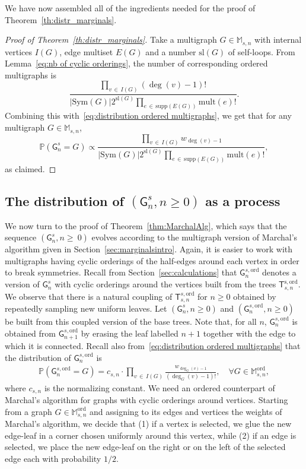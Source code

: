 \documentclass[10pt]{amsart}
\theoremstyle{definition}\newtheorem{defi}[theo]{Definition}\newtheorem{rema}[theo]{Remark}\newtheorem{exam}[theo]{Example}\newtheorem{exem}[theo]{Example}\newtheorem{nota}[theo]{Notation}
\newcommand{\abs}[1]{\left\lvert#1\right\rvert}
\newcommand{\Pp}[1]{\mathbb{P} \left(#1\right)}
\newcommand{\supp}{\mathrm{supp}}
\newcommand{\ord}{\mathrm{ord}}
\newcommand{\sll}{\mathrm{sl}}
\newcommand{\Sym}{\mathrm{Sym}}
\newcommand{\mult}{\mathrm{mult}}
\newcommand{\sG}{\mathsf{G}}
\newcommand{\sT}{\mathsf{T}}
\newcommand{\M}{\mathbb{M}}
\let\oldforall\forall
\renewcommand*{\forall}{\mathrel{\oldforall}}
\begin{document}

We have now assembled all of the ingredients needed for the proof of Theorem~\ref{th:distr_marginals}.

\begin{proof}[Proof of Theorem~\ref{th:distr_marginals}]
Take a multigraph $G\in \M_{s,n}$ with internal vertices $I(G)$, edge multiset $E(G)$ and a number $\sll(G)$ of self-loops. From Lemma~\ref{eq:nb of cyclic orderings}, the number of corresponding ordered multigraphs is
\begin{equation*}
\frac{\prod\limits_{v\,\in\,I(G)}\left(\deg(v)-1\right)!}{\abs{\Sym(G)}2^{\sll(G)}\prod\limits_{e\,\in\,\supp(E(G))}\mult(e)!}.
\end{equation*}
Combining this with~\eqref{eq:distribution ordered multigraphs}, we get that for any multigraph $G\in \M_{s,n}$,
\[
\Pp{\sG^s_{n}=G}\propto\frac{\prod\limits_{v\,\in\,I(G)} w_{\deg(v)-1}}{\abs{\Sym(G)}2^{\sll(G)}\prod\limits_{e\,\in\,\supp(E(G))}\mult(e)!},
\]
as claimed.
\end{proof}

\subsection{The distribution of \texorpdfstring{$(\sG^s_{n}, n \ge 0)$}{(sGsn, n >= 0)} as a process}\label{sec:Marchal}

We now turn to the proof of Theorem~\ref{thm:MarchalAlg}, which says that the sequence $(\sG^s_{n},n\geq~0)$ evolves according to the multigraph version of Marchal's algorithm given in Section~\ref{sec:marginalsintro}. Again, it is easier to work with multigraphs having cyclic orderings of the half-edges around each vertex in order to break symmetries. Recall from Section~\ref{sec:calculations} that $\sG^{s,\ord}_{n}$ denotes a version of $\sG^{s}_n$ with cyclic orderings around the vertices built from the trees $\sT^{\mathrm{s,ord}}_{s,n}$. We observe that there is a natural coupling of $\sT_{s,n}^{s,\ord}$ for $n \ge 0$ obtained by repeatedly sampling new uniform leaves. Let $(\sG^{s}_n, n\geq 0)$ and $(\sG^{s,\ord}_{n}, n\geq 0)$ be built from this coupled version of the base trees. Note that, for all $n$, $\sG^{s,\ord}_{n}$ is obtained from $\sG^{s,\ord}_{n+1}$ by erasing the leaf labelled $n+1$ together with the edge to which it is connected. Recall also from~\eqref{eq:distribution ordered multigraphs} that the distribution of $\sG^{s,\ord}_{n}$ is
\begin{align*}
\Pp{\sG_{n}^{s,\ord}=G}=c_{s,n}\cdot \prod_{v\,\in\, I(G)}\frac{w_{\deg_G(v)-1}}{\left(\deg_G(v)-1\right)!}, \quad \forall G \in \M_{s,n}^{\ord},
\end{align*}
where $c_{s,n}$ is the normalizing constant. We need an ordered counterpart of Marchal's algorithm for graphs with cyclic orderings around vertices. Starting from a graph $G\in\M_{s,n}^{\ord}$ and assigning to its edges and vertices the weights of Marchal's algorithm, we decide that (1) if a vertex is selected, we glue the new edge-leaf in a corner chosen uniformly around this vertex, while (2) if an edge is selected, we place the new edge-leaf on the right or on the left of the selected edge each with probability $1/2$.
\end{document}
